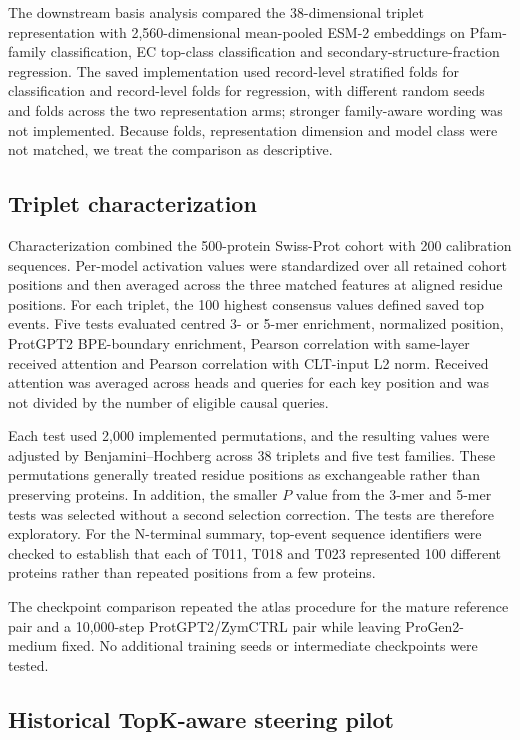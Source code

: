 \documentclass[pdflatex,sn-nature]{sn-jnl}
\begin{document}
The downstream basis analysis compared the 38-dimensional triplet representation with 2,560-dimensional mean-pooled ESM-2 embeddings on Pfam-family classification, EC top-class classification and secondary-structure-fraction regression. The saved implementation used record-level stratified folds for classification and record-level folds for regression, with different random seeds and folds across the two representation arms; stronger family-aware wording was not implemented. Because folds, representation dimension and model class were not matched, we treat the comparison as descriptive.

\subsection{Triplet characterization}

Characterization combined the 500-protein Swiss-Prot cohort with 200 calibration sequences. Per-model activation values were standardized over all retained cohort positions and then averaged across the three matched features at aligned residue positions. For each triplet, the 100 highest consensus values defined saved top events. Five tests evaluated centred 3- or 5-mer enrichment, normalized position, ProtGPT2 BPE-boundary enrichment, Pearson correlation with same-layer received attention and Pearson correlation with CLT-input L2 norm. Received attention was averaged across heads and queries for each key position and was not divided by the number of eligible causal queries.

Each test used 2,000 implemented permutations, and the resulting values were adjusted by Benjamini--Hochberg across 38 triplets and five test families. These permutations generally treated residue positions as exchangeable rather than preserving proteins. In addition, the smaller $P$ value from the 3-mer and 5-mer tests was selected without a second selection correction. The tests are therefore exploratory. For the N-terminal summary, top-event sequence identifiers were checked to establish that each of T011, T018 and T023 represented 100 different proteins rather than repeated positions from a few proteins.

The checkpoint comparison repeated the atlas procedure for the mature reference pair and a 10,000-step ProtGPT2/ZymCTRL pair while leaving ProGen2-medium fixed. No additional training seeds or intermediate checkpoints were tested.

\subsection{Historical TopK-aware steering pilot}
\end{document}
